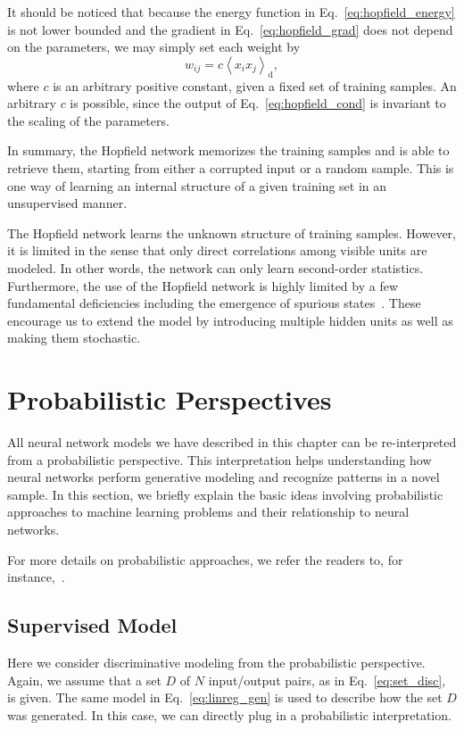 \documentclass{now}
\newcommand{\td}[0]{\text{d}}
\begin{document}
It should be noticed that because the energy function in
Eq.~\eqref{eq:hopfield_energy} is not lower bounded and the gradient in
Eq.~\eqref{eq:hopfield_grad} does not depend on the parameters, we may simply
set each weight by
\[
w_{ij} = c \left< x_i x_j \right>_\td,
\]
where $c$ is an arbitrary positive constant, given a fixed set of training
samples. An arbitrary $c$ is possible, since the output of
Eq.~\eqref{eq:hopfield_cond} is invariant to the scaling of the parameters. 

In summary, the Hopfield network memorizes the training samples and is able to
retrieve them, starting from either a corrupted input or a random sample. This
is one way of learning an internal structure of a given training set in an
unsupervised manner.

The Hopfield network learns the unknown structure of training samples. However,
it is limited in the sense that only direct correlations among visible units
are modeled. In other words, the network can only learn second-order
statistics. Furthermore, the use of the Hopfield network is highly limited by a
few fundamental deficiencies including the emergence of spurious
states~\citep[for more details, see][]{Haykin2009}. These encourage us to
extend the model by introducing multiple hidden units as well as making them
stochastic.

\section{Probabilistic Perspectives}
\label{sec:prob_perspective}

All neural network models we have described in this chapter can be
re-interpreted from a probabilistic perspective. This interpretation helps
understanding how neural networks perform generative modeling and recognize
patterns in a novel sample.  In this section, we briefly explain the basic
ideas involving probabilistic approaches to machine learning problems and their
relationship to neural networks.

For more details on probabilistic approaches, we refer the readers to, for
instance,~\citep{Murphy2012,Barber2012,Bishop2006}. 

\subsection{Supervised Model}

Here we consider discriminative modeling from the probabilistic perspective.
Again, we assume that a set $D$ of $N$ input/output pairs, as in
Eq.~\eqref{eq:set_disc}, is given. The same model in Eq.~\eqref{eq:linreg_gen}
is used to describe how the set $D$ was generated. In this case, we can
directly plug in a probabilistic interpretation.
\end{document}
